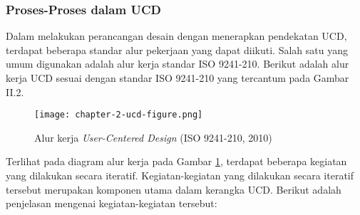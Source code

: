 \subsubsection{Proses-Proses dalam UCD}

Dalam melakukan perancangan desain dengan menerapkan pendekatan UCD, terdapat beberapa standar alur pekerjaan yang dapat diikuti. Salah satu yang umum digunakan adalah alur kerja standar ISO 9241-210. Berikut adalah alur kerja UCD sesuai dengan standar ISO 9241-210 yang tercantum pada Gambar II.2.

\begin{figure}[h]
  \centering
  \texttt{[image: chapter-2-ucd-figure.png]}
  \caption{Alur kerja \textit{User-Centered Design} (ISO 9241-210, 2010)}
  \label{fig:diagram_iso2}
\end{figure}

Terlihat pada diagram alur kerja pada Gambar \ref{fig:diagram_iso2}, terdapat beberapa kegiatan yang dilakukan secara iteratif. Kegiatan-kegiatan yang dilakukan secara iteratif tersebut merupakan komponen utama dalam kerangka UCD. Berikut adalah penjelasan mengenai kegiatan-kegiatan tersebut:

